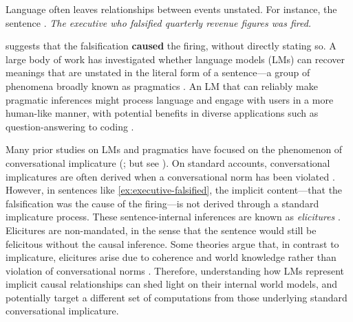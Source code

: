 \documentclass[11pt]{article}
\begin{document}

Language often leaves relationships between events unstated. For instance, the sentence 
\ex. \emph{The executive who falsified quarterly revenue figures was fired.} \label{ex:executive-falsified} 

suggests that the falsification \textbf{caused} the firing, without directly stating so. A large body of work has investigated whether language models (LMs) can recover meanings that are unstated in the literal form of a sentence---a group of phenomena broadly known as pragmatics \citep[e.g.,][]{ruis2023goldilocks,hu-etal-2023-fine,sravanthi_pub_2024,ma_pragmatics_2025}. An LM that can reliably make pragmatic inferences might process language and engage with users in a more human-like manner, with potential benefits in diverse applications such as question-answering \citep{hawkins_relevant_2025} to coding \citep{cao-etal-2025-pragmatic}.

Many prior studies on LMs and pragmatics have focused on the phenomenon of conversational implicature (\citealt{ruis2023goldilocks, jeretic-etal-2020-natural, schuster-etal-2020-harnessing, li-etal-2021-predicting}; but see \citealt{pan-kehler-2025-pragmatic}). On standard accounts, conversational implicatures are often derived when a conversational norm has been violated \citep{grice-1975-logic}. However, in sentences like \ref{ex:executive-falsified}, the implicit content---that the falsification was the cause of the firing---is not derived through a standard implicature process. These sentence-internal inferences are known as \emph{elicitures} \citep{cohen-kehler-2021-conversational}. Elicitures are non-mandated, in the sense that the sentence would still be felicitous without the causal inference. Some theories argue that, in contrast to implicature, elicitures arise due to coherence and world knowledge rather than violation of conversational norms \citep{cohen-kehler-2021-conversational,rohde-etal-2011-anticipating}. Therefore, understanding how LMs represent implicit causal relationships can shed light on their internal world models, and potentially target a different set of computations from those underlying standard conversational implicature. %
\end{document}
